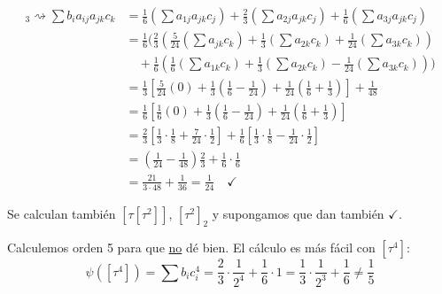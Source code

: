 \begin{sol}
\begin{align*}
    [\tau]_3 \rightsquigarrow \sum b_i a_{ij} a_{jk} c_k &= \frac{1}{6}\left(\sum a_{1j} a_{jk} c_j\right) + \frac{2}{3}\left(\sum a_{2j} a_{jk} c_j\right) + \frac{1}{6}\left(\sum a_{3j} a_{jk} c_j\right) \\
    &= \frac{1}{6}\Big( \frac{2}{3}\left( \frac{5}{24}\left(\sum a_{jk} c_k\right) + \frac{1}{3}\left(\sum a_{2k} c_k\right) + \frac{1}{24}\left(\sum a_{3k} c_k\right) \right) \\
    &\quad + \frac{1}{6}\left( \frac{1}{6}\left(\sum a_{1k} c_k\right) + \frac{1}{3}\left(\sum a_{2k} c_k\right) - \frac{1}{24}\left(\sum a_{3k} c_k\right) \right) \Big) \\
    &= \frac{1}{3}\left[ \frac{5}{24}(0) + \frac{1}{3}\left(\frac{1}{6} - \frac{1}{24}\right) + \frac{1}{24}\left(\frac{1}{6} + \frac{1}{3}\right) \right] + \frac{1}{48} \\
    &= \frac{1}{6}\left[ \frac{1}{6}(0) + \frac{1}{3}\left(\frac{1}{6} - \frac{1}{24}\right) + \frac{1}{24}\left(\frac{1}{6} + \frac{1}{3}\right) \right] \\
    &= \frac{2}{3}\left[ \frac{1}{3}\cdot \frac{1}{8} + \frac{7}{24}\cdot \frac{1}{2} \right] + \frac{1}{6}\left[ \frac{1}{3}\cdot \frac{1}{8} - \frac{1}{24}\cdot \frac{1}{2} \right] \\
    &= \left( \frac{1}{24} - \frac{1}{48} \right)\frac{2}{3} + \frac{1}{6}\cdot \frac{1}{6} \\
    &= \frac{21}{3\cdot 48} + \frac{1}{36} = \frac{1}{24} \quad \checkmark
\end{align*}

\noindent Se calculan tambi\'en $[\tau[\tau^2]]$, $[\tau^2]_2$ y supongamos que dan tambi\'en $\checkmark$.

Calculemos orden 5 para que \underline{no} dé bien. El c\'alculo es más fácil con $[\tau^4]$:
$$ \psi([\tau^4]) = \sum b_i c_i^4 = \frac{2}{3}\cdot \frac{1}{2^4} + \frac{1}{6}\cdot 1 = \frac{1}{3}\cdot \frac{1}{2^3} + \frac{1}{6} \neq \frac{1}{5} $$

\end{sol}

















